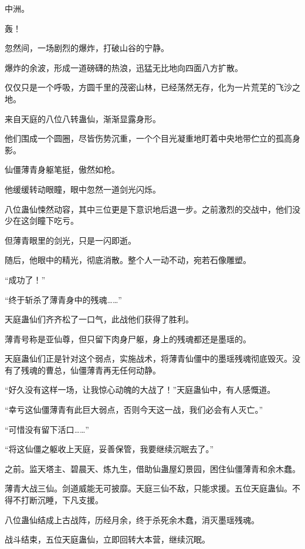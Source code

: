 
\begin{this_body}

中洲。

轰！

忽然间，一场剧烈的爆炸，打破山谷的宁静。

爆炸的余波，形成一道磅礴的热浪，迅猛无比地向四面八方扩散。

仅仅只是一个呼吸，方圆千里的茂密山林，已经荡然无存，化为一片荒芜的飞沙之地。

来自天庭的八位八转蛊仙，渐渐显露身形。

他们围成一个圆圈，尽皆伤势沉重，一个个目光凝重地盯着中央地带伫立的孤高身影。

仙僵薄青身躯笔挺，傲然如枪。

他缓缓转动眼瞳，眼中忽然一道剑光闪烁。

八位蛊仙悚然动容，其中三位更是下意识地后退一步。之前激烈的交战中，他们没少在这剑瞳下吃亏。

但薄青眼里的剑光，只是一闪即逝。

随后，他眼中的精光，彻底消散。整个人一动不动，宛若石像雕塑。

“成功了！”

“终于斩杀了薄青身中的残魂……”

天庭蛊仙们齐齐松了一口气，此战他们获得了胜利。

薄青号称是亚仙尊，但只留下肉身尸躯，身上的残魂都还是墨瑶的。

天庭蛊仙们正是针对这个弱点，实施战术，将薄青仙僵中的墨瑶残魂彻底毁灭。没有了残魂的曹总，仙僵薄青再无任何动静。

“好久没有这样一场，让我惊心动魄的大战了！”天庭蛊仙中，有人感慨道。

“幸亏这仙僵薄青有此巨大弱点，否则今天这一战，我们必会有人灭亡。”

“可惜没有留下活口……”

“将这仙僵之躯收上天庭，妥善保管，我要继续沉眠去了。”

之前。监天塔主、碧晨天、炼九生，借助仙蛊屋幻景园，困住仙僵薄青和余木蠢。

薄青大战三仙。剑道威能无可披靡。天庭三仙不敌，只能求援。五位天庭蛊仙。不得不打断沉睡，下凡支援。

八位蛊仙结成上古战阵，历经月余，终于杀死余木蠢，消灭墨瑶残魂。

战斗结束，五位天庭蛊仙，立即回转大本营，继续沉眠。


\end{this_body}
